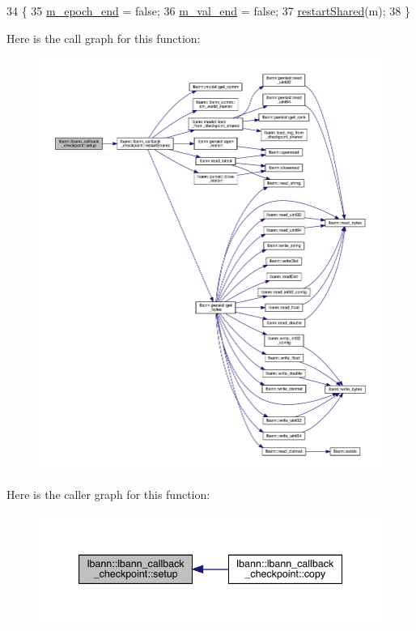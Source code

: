 \begin{DoxyCode}
34                                               \{
35   \hyperlink{classlbann_1_1lbann__callback__checkpoint_a9632d5f0078d3ff2015e96dba789e15c}{m\_epoch\_end} = \textcolor{keyword}{false};
36   \hyperlink{classlbann_1_1lbann__callback__checkpoint_a3827e5bb569f80d790c3ac856a7c39b5}{m\_val\_end} = \textcolor{keyword}{false};
37   \hyperlink{classlbann_1_1lbann__callback__checkpoint_a40d369278bc5963ba2f3cca1750ba004}{restartShared}(m);
38 \}
\end{DoxyCode}
Here is the call graph for this function\+:\nopagebreak
\begin{figure}[H]
\begin{center}
\leavevmode
\includegraphics[width=350pt]{classlbann_1_1lbann__callback__checkpoint_a383654a7bb70672dfc9fef679f4b509f_cgraph}
\end{center}
\end{figure}
Here is the caller graph for this function\+:\nopagebreak
\begin{figure}[H]
\begin{center}
\leavevmode
\includegraphics[width=340pt]{classlbann_1_1lbann__callback__checkpoint_a383654a7bb70672dfc9fef679f4b509f_icgraph}
\end{center}
\end{figure}


